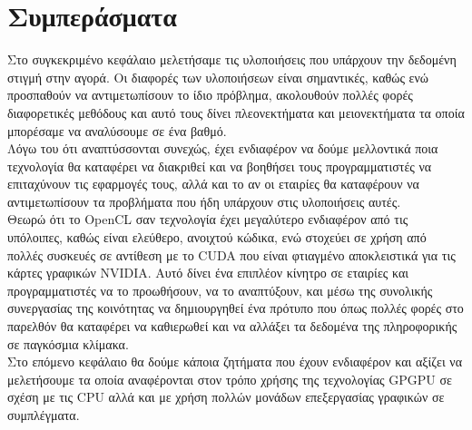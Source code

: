 \section{Συμπεράσματα}
Στο συγκεκριμένο κεφάλαιο μελετήσαμε τις υλοποιήσεις που υπάρχουν την δεδομένη στιγμή στην αγορά. Οι διαφορές των υλοποιήσεων είναι σημαντικές, καθώς ενώ προσπαθούν να αντιμετωπίσουν το ίδιο πρόβλημα, ακολουθούν πολλές φορές διαφορετικές μεθόδους και αυτό τους δίνει πλεονεκτήματα και μειονεκτήματα τα οποία μπορέσαμε να αναλύσουμε σε ένα βαθμό.\\

Λόγω του ότι αναπτύσσονται συνεχώς, έχει ενδιαφέρον να δούμε μελλοντικά ποια τεχνολογία θα καταφέρει να διακριθεί και να βοηθήσει τους προγραμματιστές να επιταχύνουν τις εφαρμογές τους, αλλά και το αν οι εταιρίες θα καταφέρουν να αντιμετωπίσουν τα προβλήματα που ήδη υπάρχουν στις υλοποιήσεις αυτές. \\

Θεωρώ ότι το OpenCL σαν τεχνολογία έχει μεγαλύτερο ενδιαφέρον από τις υπόλοιπες, καθώς είναι ελεύθερο, ανοιχτού κώδικα, ενώ στοχεύει σε χρήση από πολλές συσκευές σε αντίθεση με το CUDA που είναι φτιαγμένο αποκλειστικά για τις κάρτες γραφικών NVIDIA. Αυτό δίνει ένα επιπλέον κίνητρο σε εταιρίες και προγραμματιστές να το προωθήσουν, να το αναπτύξουν, και μέσω της συνολικής συνεργασίας της κοινότητας να δημιουργηθεί ένα πρότυπο που όπως πολλές φορές στο παρελθόν θα καταφέρει να καθιερωθεί και να αλλάξει τα δεδομένα της πληροφορικής σε παγκόσμια κλίμακα.\\

Στο επόμενο κεφάλαιο θα δούμε κάποια ζητήματα που έχουν ενδιαφέρον και αξίζει να μελετήσουμε τα οποία αναφέρονται στον τρόπο χρήσης της τεχνολογίας GPGPU σε σχέση με τις CPU αλλά και με χρήση πολλών μονάδων επεξεργασίας γραφικών σε συμπλέγματα.